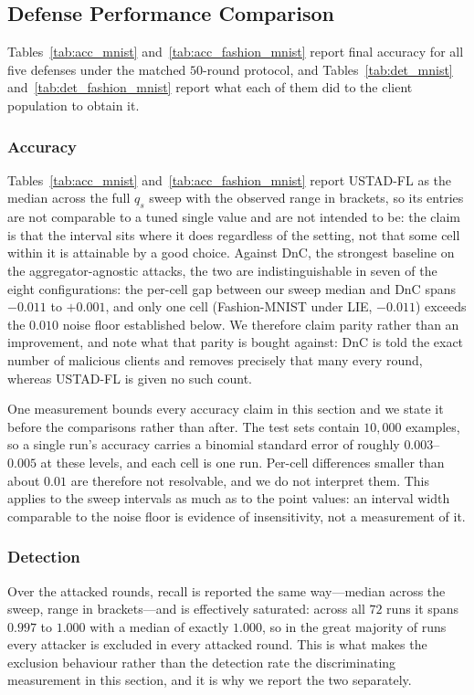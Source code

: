 \documentclass[journal]{IEEEtran}
\begin{document}
\subsection{Defense Performance Comparison}
\label{sec:defense_comparison}

Tables~\ref{tab:acc_mnist} and~\ref{tab:acc_fashion_mnist} report final accuracy for all five defenses under the matched $50$-round protocol, and Tables~\ref{tab:det_mnist} and~\ref{tab:det_fashion_mnist} report what each of them did to the client population to obtain it.

\subsubsection{Accuracy}
Tables~\ref{tab:acc_mnist} and~\ref{tab:acc_fashion_mnist} report USTAD-FL as the median across the full $q_s$ sweep with the observed range in brackets, so its entries are not comparable to a tuned single value and are not intended to be: the claim is that the interval sits where it does regardless of the setting, not that some cell within it is attainable by a good choice. Against DnC, the strongest baseline on the aggregator-agnostic attacks, the two are indistinguishable in seven of the eight configurations: the per-cell gap between our sweep median and DnC spans $-0.011$ to $+0.001$, and only one cell (Fashion-MNIST under LIE, $-0.011$) exceeds the $0.010$ noise floor established below. We therefore claim parity rather than an improvement, and note what that parity is bought against: DnC is told the exact number of malicious clients and removes precisely that many every round, whereas USTAD-FL is given no such count.

One measurement bounds every accuracy claim in this section and we state it before the comparisons rather than after. The test sets contain $10{,}000$ examples, so a single run's accuracy carries a binomial standard error of roughly $0.003$--$0.005$ at these levels, and each cell is one run. Per-cell differences smaller than about $0.01$ are therefore not resolvable, and we do not interpret them. This applies to the sweep intervals as much as to the point values: an interval width comparable to the noise floor is evidence of insensitivity, not a measurement of it.

\subsubsection{Detection}
Over the attacked rounds, recall is reported the same way---median across the sweep, range in brackets---and is effectively saturated: across all $72$ runs it spans $0.997$ to $1.000$ with a median of exactly $1.000$, so in the great majority of runs every attacker is excluded in every attacked round. This is what makes the exclusion behaviour rather than the detection rate the discriminating measurement in this section, and it is why we report the two separately.
\end{document}
